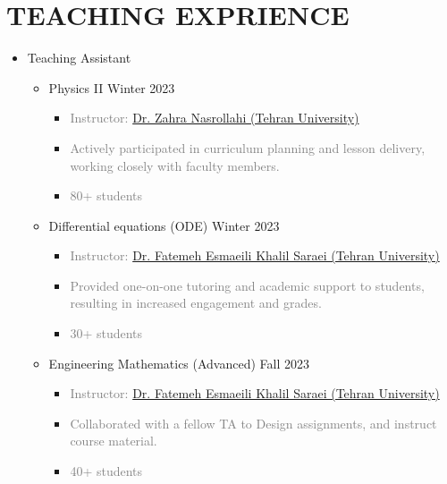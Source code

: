 \documentclass[11pt,a4paper,sans]{moderncv} %
\newcommand*{\authorimg}[1]{%
	\raisebox{-.25\baselineskip}{%
		\texttt{[image: \#1]}%
	}%
}
\begin{document}
\section{TEACHING EXPRIENCE}
    \begin{itemize}
	\item Teaching Assistant
		\begin{itemize}	
			\item \authorimg{Images/TehranUni.jpg} Physics II \hfill Winter 2023
    			\begin{itemize} 
    				\item\textcolor{gray}{Instructor: \href{https://profile.ut.ac.ir/en/~z.nasr}{Dr. Zahra Nasrollahi (Tehran University)}}
                        \item\textcolor{gray} {Actively participated in curriculum planning and lesson delivery, working closely with faculty members.}
                        \item\textcolor{gray}{80+ students}
    			\end{itemize}
       
			\item \authorimg{Images/TehranUni.jpg} Differential equations (ODE) \hfill Winter 2023
    			\begin{itemize}
    				\item \textcolor{gray}{Instructor: \href{https://profile.ut.ac.ir/en/~f.esmaeili.kh}{Dr. Fatemeh Esmaeili Khalil Saraei  (Tehran University)}}
                        \item\textcolor{gray} {Provided one-on-one tutoring and academic support to students, resulting in increased engagement and grades.}
                        \item\textcolor{gray}{30+ students}
    			\end{itemize}

			\item \authorimg{Images/TehranUni.jpg} Engineering Mathematics (Advanced) \hfill Fall 2023
    			\begin{itemize} 
    				\item \textcolor{gray}{Instructor: \href{https://profile.ut.ac.ir/en/~f.esmaeili.kh}{Dr. Fatemeh Esmaeili Khalil Saraei  (Tehran University)}}
                        \item\textcolor{gray} {Collaborated with a fellow TA to Design assignments, and instruct course material.}
                        \item\textcolor{gray}{40+ students}
    			\end{itemize}
		\end{itemize}
    \end{itemize}
\end{document}
